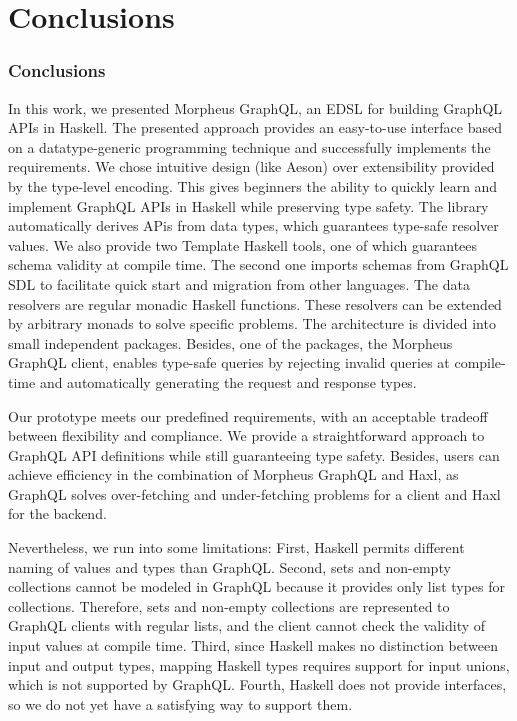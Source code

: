 \section{Conclusions}

\begin{frame}\frametitle{Conclusions}

In this work, we presented Morpheus GraphQL, an EDSL for building GraphQL APIs in Haskell. The presented approach provides an easy-to-use interface based on a datatype-generic programming technique and successfully implements the requirements. We chose intuitive design (like Aeson) over extensibility provided by the type-level encoding. 
This gives beginners the ability to quickly learn and implement GraphQL APIs in Haskell while preserving type safety.
The library automatically derives APis from data types, which guarantees type-safe resolver values. We also provide two Template Haskell tools, one of which guarantees schema validity at compile time. The second one imports schemas from GraphQL SDL to facilitate quick start and migration from other languages.
The data resolvers are regular monadic Haskell functions. These resolvers can be extended by arbitrary monads to solve specific problems.  The architecture is divided into small independent packages. Besides, one of the packages, the Morpheus GraphQL client, enables type-safe queries by rejecting invalid queries at compile-time and automatically generating the request and response types.

Our prototype meets our predefined requirements, with an acceptable tradeoff between flexibility and compliance. We provide a straightforward approach to GraphQL API definitions while still guaranteeing type safety. Besides, users can achieve efficiency in the combination of Morpheus GraphQL and Haxl, as GraphQL solves over-fetching and under-fetching problems for a client and  Haxl for the backend.
    
Nevertheless, we run into some limitations: First, Haskell permits different naming of values and types than GraphQL. Second, sets and non-empty collections cannot be modeled in GraphQL because it provides only list types for collections. Therefore, sets and non-empty collections are represented to GraphQL clients with regular lists, and the client cannot check the validity of input values at compile time. Third, since Haskell makes no distinction between input and output types, mapping Haskell types requires support for input unions, which is not supported by GraphQL. Fourth, Haskell does not provide interfaces, so we do not yet have a satisfying way to support them. 

\end{frame}



